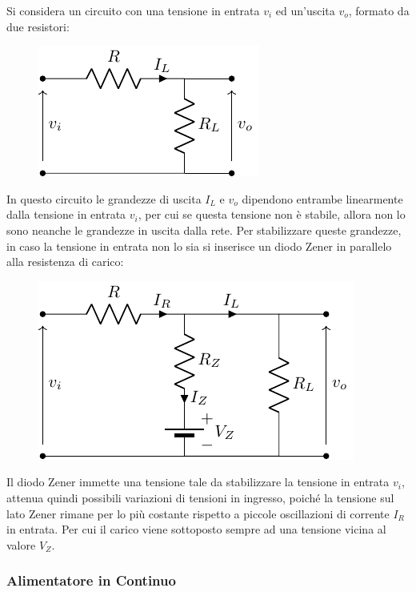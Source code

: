 \documentclass{article}
\numberwithin{equation}{subsection}
\begin{document}
Si considera un circuito con una tensione in entrata $v_i$ ed un'uscita $v_o$, formato da due resistori:
\begin{figure}[H]%
    \centering
    \includegraphics{circuito-zener.pdf}%
    \label{fig:circuito-zener}
\end{figure}
In questo circuito le grandezze di uscita $I_L$ e $v_o$ dipendono entrambe linearmente dalla tensione in entrata $v_i$, per cui se questa tensione 
non è stabile, allora non lo sono neanche le grandezze in uscita dalla rete. Per stabilizzare queste grandezze, in caso la tensione in entrata non lo 
sia si inserisce un diodo Zener in parallelo alla resistenza di carico:
\begin{figure}[H]%
    \centering
    \includegraphics{circuito-diodo-zener.pdf}%
    \label{fig:circuito-diodo-zener}
\end{figure}

Il diodo Zener immette una tensione tale da stabilizzare la tensione in entrata $v_i$, attenua quindi possibili variazioni di tensioni in ingresso, poiché la tensione 
sul lato Zener rimane per lo più costante rispetto a piccole oscillazioni di corrente $I_R$ in entrata. Per cui il carico viene sottoposto sempre ad una tensione vicina 
al valore $V_Z$. 

\subsubsection{Alimentatore in Continuo}
\end{document}
